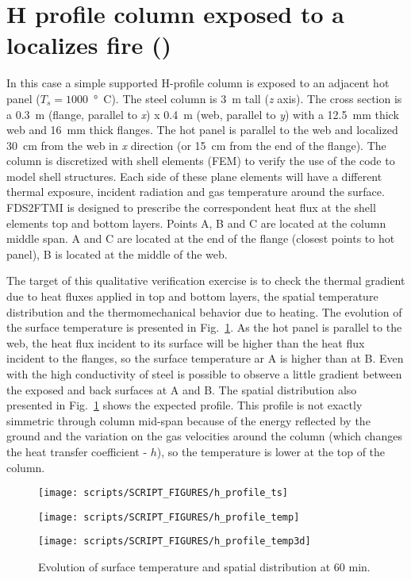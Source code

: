 \documentclass[11pt]{book}
\begin{document}
\section{H profile column exposed to a localizes fire (\texorpdfstring{}{h\_profile})}

In this case a simple supported H-profile column is exposed to an adjacent hot panel ($T_s=1000$~\si{\degree C}). The steel column is 3~m tall (\textit{z} axis). The cross section is a 0.3~m (flange, parallel to \textit{x}) x 0.4~m (web, parallel to \textit{y}) with a 12.5~mm thick web and 16~mm thick flanges. The hot panel is parallel to the web and localized 30~cm from the web in \textit{x} direction (or 15~cm from the end of the flange).
The column is discretized with shell elements (FEM) to verify the use of the code to model shell structures. Each side of these plane elements will have a different thermal exposure, incident radiation and gas temperature around the surface. FDS2FTMI is designed to prescribe the correspondent heat flux at the shell elements top and bottom layers. Points A, B and C are located at the column middle span. A and C are located at the end of the flange (closest points to hot panel), B is located at the middle of the web.

The target of this qualitative verification exercise is to check the thermal gradient due to heat fluxes applied in top and bottom layers, the spatial temperature distribution and the thermomechanical behavior due to heating. The evolution of the surface temperature is presented in Fig.~\ref{h_profile1}. As the hot panel is parallel to the web, the heat flux incident to its surface will be higher than the heat flux incident to the flanges, so the surface temperature ar A is higher than at B. Even with the high conductivity of steel is possible to observe a little gradient between the exposed and back surfaces at A and B. The spatial distribution also presented in Fig.~\ref{h_profile1} shows the expected profile. This profile is not exactly simmetric through column mid-span because of the energy reflected by the ground and the variation on the gas velocities around the column (which changes the heat transfer coefficient - $h$), so the temperature is lower at the top of the column.

\begin{figure}[ht]
\noindent
\parbox[c]{22em}{\texttt{[image: scripts/SCRIPT\_FIGURES/h\_profile\_ts]}} 
\parbox[c]{11em}{\texttt{[image: scripts/SCRIPT\_FIGURES/h\_profile\_temp]}} 
\parbox[c]{1em}{\texttt{[image: scripts/SCRIPT\_FIGURES/h\_profile\_temp3d]}} 
\caption[The  results]{Evolution of surface temperature and spatial distribution at 60 min.}
\label{h_profile1}
\end{figure}
\end{document}
